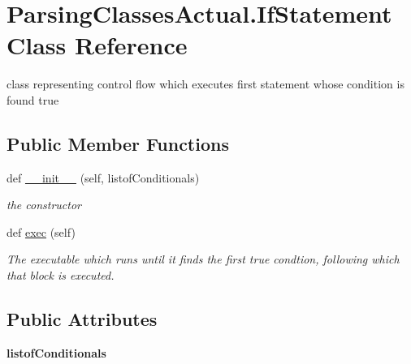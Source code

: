 \hypertarget{class_parsing_classes_actual_1_1_if_statement}{}\section{Parsing\+Classes\+Actual.\+If\+Statement Class Reference}
\label{class_parsing_classes_actual_1_1_if_statement}


class representing control flow which executes first statement whose condition is found true  


\subsection*{Public Member Functions}
\begin{DoxyCompactItemize}
\item 
def \hyperlink{class_parsing_classes_actual_1_1_if_statement_adcb418725eec33d6e81784b67c1fe776}{\+\_\+\+\_\+init\+\_\+\+\_\+} (self, listof\+Conditionals)
\begin{DoxyCompactList}\small\item\em the constructor \end{DoxyCompactList}\item 
\mbox{\label{class_parsing_classes_actual_1_1_if_statement_aede84cbec163184d403eb3626c08ed41}} 
def \hyperlink{class_parsing_classes_actual_1_1_if_statement_aede84cbec163184d403eb3626c08ed41}{exec} (self)
\begin{DoxyCompactList}\small\item\em The executable which runs until it finds the first true condtion, following which that block is executed. \end{DoxyCompactList}\end{DoxyCompactItemize}
\subsection*{Public Attributes}
\begin{DoxyCompactItemize}
\item 
\mbox{\label{class_parsing_classes_actual_1_1_if_statement_a4b1d2d5524d305d12c7bee2d03f7877d}} 
{\bfseries listof\+Conditionals}
\end{DoxyCompactItemize}


